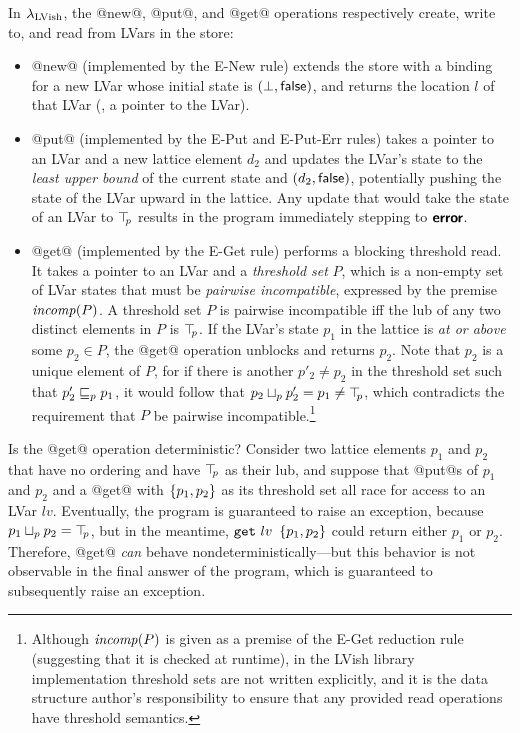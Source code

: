 \documentclass{article}
\begin{document}
In $\lambda_{\textrm{LVish}}$, the @new@, @put@, and @get@ operations respectively
create, write to, and read from LVars in the store:
\begin{itemize}
\item @new@ (implemented by the {\sc E-New} rule) extends the store
  with a binding for a new LVar whose initial state is $(\bot,
  \textsf{false})$, and returns the location $l$ of that LVar (\ie, a
  pointer to the LVar).
\item @put@ (implemented by the {\sc E-Put} and {\sc E-Put-Err} rules)
  takes a pointer to an LVar and a new lattice element $d_2$ and
  updates the LVar's state to the {\em least upper bound} of the
  current state and $(d_2, \textsf{false})$, potentially pushing
  the state of the LVar upward in the lattice.  Any update that would
  take the state of an LVar to $\top\hspace{-0.85mm}_{p}$ results in the program
  immediately stepping to $\textbf{\textsf{error}}$.
\item @get@ (implemented by the {\sc E-Get} rule) performs a blocking
  threshold read.  It takes a pointer to an LVar and a \emph{threshold
    set} $P$, which is a non-empty set of LVar states that must be
  \emph{pairwise incompatible}, expressed by the premise $\mathit{incomp}(P)$.
  A threshold set $P$ is pairwise incompatible iff the lub of any two
  distinct elements in $P$ is $\top\hspace{-0.85mm}_{p}$.  If the LVar's state $p_1$ in
  the lattice is {\em at or above} some $p_2 \in P$, the @get@
  operation unblocks and returns $p_2$.  Note that $p_2$ is a unique
  element of $P$, for if there is another $p'_2 \neq p_2$ in the
  threshold set such that $p'_2 \sqsubseteq_p p_1$, it would follow that
  $p_2 \sqcup_p p'_2 = p_1 \neq \top\hspace{-0.85mm}_{p}$, which contradicts the
  requirement that $P$ be pairwise incompatible.\footnote{Although
    $\mathit{incomp}(P)$ is given as a premise of the {\sc E-Get} reduction
    rule (suggesting that it is checked at runtime), in the LVish
    library implementation threshold sets are not written explicitly,
    and it is the data structure author's responsibility to ensure
    that any provided read operations have threshold semantics.}
\end{itemize}
Is the @get@ operation deterministic?  Consider two lattice elements
$p_1$ and $p_2$ that have no ordering and have $\top\hspace{-0.85mm}_{p}$ as their lub,
and suppose that @put@s of $p_1$ and $p_2$ and a @get@ with
$\left\{p_1, p_2\right\}$ as its threshold set all race for access to an LVar
$lv$.  Eventually, the program is guaranteed to raise an exception,
because $p_1 \sqcup_p p_2 = \top\hspace{-0.85mm}_{p}$, but in the meantime,
$\mbox{\texttt{get}}~lv~\left\{p_1, p_2\right\}$ could return either $p_1$ or $p_2$.
Therefore, @get@ \emph{can} behave nondeterministically---but this
behavior is not observable in the final answer of the program, which
is guaranteed to subsequently raise an exception.
\end{document}

